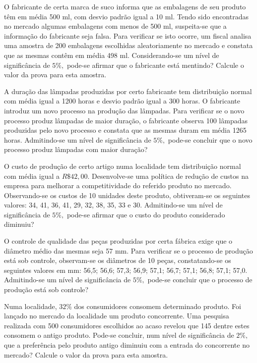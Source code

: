 \documentclass{report}
\begin{document}
\begin{Exercise}
\Question O fabricante de certa marca de suco informa que as embalagens de seu produto têm em média 500 ml, com desvio padrão igual a 10 ml. Tendo sido encontradas 
no mercado algumas embalagens com menos de 500 ml, suspeita-se que a informação do fabricante seja falsa. Para verificar se isto ocorre, um fiscal analisa uma amostra 
de 200 embalagens escolhidas aleatoriamente no mercado e constata que as mesmas contêm em média 498 ml. Considerando-se um nível de significância de $5\%,$ 
pode-se afirmar que o fabricante está mentindo? Calcule o valor da prova para esta amostra.

\Question A duração das lâmpadas produzidas por certo fabricante tem distribuição normal com média igual a 1200 horas e desvio padrão igual a 300 horas. O fabricante 
introduz um novo processo na produção das lâmpadas. Para verificar se o novo processo produz lâmpadas de maior duração, o fabricante observa 100 lâmpadas produzidas 
pelo novo processo e constata que as mesmas duram em média 1265 horas. Admitindo-se um nível de significância de $5\%,$ pode-se concluir que o novo processo produz 
lâmpadas com maior duração?

\Question O custo de produção de certo artigo numa localidade tem distribuição normal com média igual a $R\$42,00.$ Desenvolve-se uma política de redução de custos 
na empresa para melhorar a competitividade do referido produto no mercado. Observando-se os custos de 10 unidades deste produto, obtiveram-se os seguintes valores: 
34, 41, 36, 41, 29, 32, 38, 35, 33 e 30. Admitindo-se um nível de significância de $5\%,$ pode-se afirmar que o custo do produto considerado diminuiu? 

\Question O controle de qualidade das peças produzidas por certa fábrica exige que o diâmetro médio das mesmas seja 57 mm. Para verificar se o processo de produção 
está sob controle, observam-se os diâmetros de 10 peças, constatando-se os seguintes valores em mm: 56,5; 56,6; 57,3; 56,9; 57,1; 56,7; 57,1; 56,8; 57,1; 57,0. 
Admitindo-se um nível de significância de $5\%,$ pode-se concluir que o processo de produção está sob controle?

\Question Numa localidade, $32\%$ dos consumidores consomem determinado produto. Foi lançado no mercado da localidade um produto concorrente. Uma pesquisa 
realizada com 500 consumidores escolhidos ao acaso revelou que 145 dentre estes consomem o antigo produto. Pode-se concluir, num nível de significância de $2\%,$ que 
a preferência pelo produto antigo diminuiu com a entrada do concorrente no mercado? Calcule o valor da prova para esta amostra. 


\end{Exercise}
\end{document}
